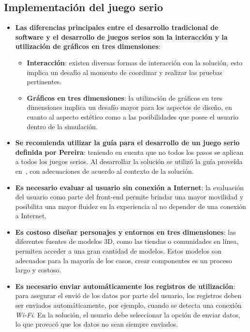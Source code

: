 \subsection{Implementación del juego serio}


\begin{itemize}

\item \textbf{Las diferencias principales entre el desarrollo tradicional de software  y el desarrollo de juegos serios son la interacción y la utilización de gráficos en tres dimensiones}:

    \begin{itemize}

    \item \textbf{Interacción}: existen diversas formas de interacción con la solución, esto implica un desafío al momento de coordinar y realizar las pruebas pertinentes.

    \item \textbf{Gráficos en tres dimensiones}: la utilización de gráficos en tres dimensiones implica un desafío mayor para los aspectos de diseño, en cuanto al aspecto estético como a las posibilidades que posee el usuario dentro de la simulación.

    \end{itemize}


\item \textbf{Se recomienda utilizar la guía para el desarrollo de un juego serio definida por Pereira\cite{pereira2009design}}: teniendo en cuenta que no todos los pasos se aplican a todos los juegos serios. Al desarrollar la solución se utilizó la guía proveída en~\cite{pereira2009design}, con adecuaciones de acuerdo al contexto de la solución.


\item \textbf{Es necesario evaluar al usuario sin conexión a Internet}: la evaluación del usuario como parte del front-end permite brindar una mayor movilidad y posibilita una mayor fluidez en la experiencia al no depender de una conexión a Internet.

\item \textbf{Es costoso diseñar personajes y entornos en tres dimensiones}: las diferentes fuentes de modelos 3D, como las tiendas o comunidades en línea, permiten acceder a una gran cantidad de modelos. Estos modelos son adecuados para la mayoría de los casos, crear componentes es un proceso largo y costoso.

\item \textbf{Es necesario enviar automáticamente los registros de utilización}: para asegurar el envió de los datos por parte del usuario, los registros deben ser enviados automáticamente, por ejemplo, cuando se detecta una conexión \textit{Wi-Fi}. En la solución, el usuario debe seleccionar la opción de enviar datos, lo que provocó que los datos no sean siempre enviados.

\end{itemize}

